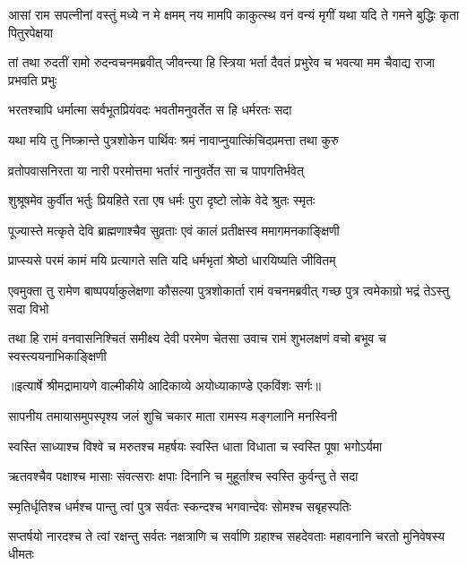 \threelineshloka
{आसां राम सपत्नीनां वस्तुं मध्ये न मे क्षमम्}
{नय मामपि काकुत्स्थ वनं वन्यं मृगीं यथा}
{यदि ते गमने बुद्धिः कृता पितुरपेक्षया} %

\threelineshloka
{तां तथा रुदतीं रामो रुदन्वचनमब्रवीत्}
{जीवन्त्या हि स्त्रिया भर्ता दैवतं प्रभुरेव च}
{भवत्या मम चैवाद्य राजा प्रभवति प्रभुः} %

\twolineshloka
{भरतश्चापि धर्मात्मा सर्वभूतप्रियंवदः}
{भवतीमनुवर्तेत स हि धर्मरतः सदा} %

\twolineshloka
{यथा मयि तु निष्क्रान्ते पुत्रशोकेन पार्थिवः}
{श्रमं नावाप्नुयात्किंचिदप्रमत्ता तथा कुरु} %

\twolineshloka
{व्रतोपवासनिरता या नारी परमोत्तमा}
{भर्तारं नानुवर्तेत सा च पापगतिर्भवेत्} %

\twolineshloka
{शुश्रूषमेव कुर्वीत भर्तुः प्रियहिते रता}
{एष धर्मः पुरा दृष्टो लोके वेदे श्रुतः स्मृतः} %

\twolineshloka
{पूज्यास्ते मत्कृते देवि ब्राह्मणाश्चैव सुव्रताः}
{एवं कालं प्रतीक्षस्व ममागमनकाङ्क्षिणी} %

\twolineshloka
{प्राप्स्यसे परमं कामं मयि प्रत्यागते सति}
{यदि धर्मभृतां श्रेष्ठो धारयिष्यति जीवितम्} %

\threelineshloka
{एवमुक्ता तु रामेण बाष्पपर्याकुलेक्षणा}
{कौसल्या पुत्रशोकार्ता रामं वचनमब्रवीत्}
{गच्छ पुत्र त्वमेकाग्रो भद्रं तेऽस्तु सदा विभो} %

\fourlineindentedshloka
{तथा हि रामं वनवासनिश्चितं}
{ समीक्ष्य देवी परमेण चेतसा}
{उवाच रामं शुभलक्षणं वचो}
{ बभूव च स्वस्त्ययनाभिकाङ्क्षिणी} %


{॥इत्यार्षे श्रीमद्रामायणे वाल्मीकीये आदिकाव्ये अयोध्याकाण्डे एकविंशः सर्गः॥}


\twolineshloka
{सापनीय तमायासमुपस्पृश्य जलं शुचि}
{चकार माता रामस्य मङ्गलानि मनस्विनी} %

\twolineshloka
{स्वस्ति साध्याश्च विश्वे च मरुतश्च महर्षयः}
{स्वस्ति धाता विधाता च स्वस्ति पूषा भगोऽर्यमा} %

\twolineshloka
{ऋतवश्चैव पक्षाश्च मासाः संवत्सराः क्षपाः}
{दिनानि च मुहूर्ताश्च स्वस्ति कुर्वन्तु ते सदा} %

\twolineshloka
{स्मृतिर्धृतिश्च धर्मश्च पान्तु त्वां पुत्र सर्वतः}
{स्कन्दश्च भगवान्देवः सोमश्च सबृहस्पतिः} %

\threelineshloka
{सप्तर्षयो नारदश्च ते त्वां रक्षन्तु सर्वतः}
{नक्षत्राणि च सर्वाणि ग्रहाश्च सहदेवताः}
{महावनानि चरतो मुनिवेषस्य धीमतः} %

